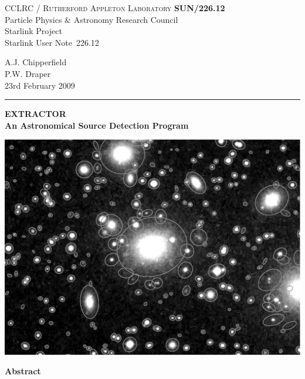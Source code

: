 \documentclass[twoside,11pt]{article}
\newcommand{\stardoccategory}  {Starlink User Note}
\newcommand{\stardocinitials}  {SUN}
\newcommand{\stardocnumber}    {226.12}
\newcommand{\stardocauthors}   {A.J. Chipperfield\\
                                P.W. Draper}
\newcommand{\stardocdate}      {23rd February 2009}
\newcommand{\stardoctitle}     {EXTRACTOR\\
                                An Astronomical Source Detection Program}
\newcommand{\stardocname}{\stardocinitials /\stardocnumber}
\newenvironment{latexonly}{}{}
\renewcommand{\_}{\texttt{\symbol{95}}}
\begin{document}
\thispagestyle{empty}

\begin{latexonly}
   CCLRC / \textsc{Rutherford Appleton Laboratory} \hfill \textbf{\stardocname}\\
   {\large Particle Physics \& Astronomy Research Council}\\
   {\large Starlink Project\\}
   {\large \stardoccategory\ \stardocnumber}
   \begin{flushright}
   \stardocauthors\\
   \stardocdate
   \end{flushright}
   \vspace{-4mm}
   \rule{\textwidth}{0.5mm}
   \vspace{4mm}
   \begin{center}
   {\LARGE\textbf{\stardoctitle} \\ [2.5ex]}
   \vspace{4mm}

   \includegraphics[scale=0.6]{sun226fig.ps}
   \end{center}

   \vspace{5mm}
   \begin{center}
      {\Large\textbf{Abstract}}
   \end{center}
\end{latexonly}
\end{document}
